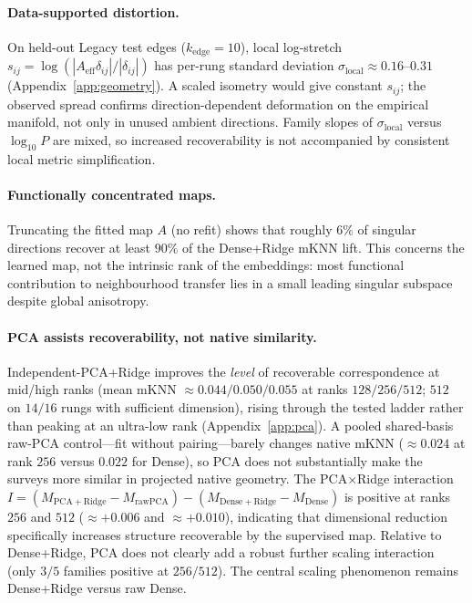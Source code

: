 \documentclass{article}
\begin{document}
\paragraph{Data-supported distortion.}
On held-out Legacy test edges (\(k_{\mathrm{edge}}{=}10\)), local log-stretch
\(s_{ij}=\log(|A_{\mathrm{eff}}\delta_{ij}|/|\delta_{ij}|)\)
has per-rung standard deviation \(\sigma_{\mathrm{local}}\approx0.16\)--\(0.31\) (Appendix~\ref{app:geometry}).
A scaled isometry would give constant \(s_{ij}\); the observed spread confirms direction-dependent deformation on the empirical manifold, not only in unused ambient directions.
Family slopes of \(\sigma_{\mathrm{local}}\) versus \(\log_{10}P\) are mixed, so increased recoverability is not accompanied by consistent local metric simplification.

\paragraph{Functionally concentrated maps.}
Truncating the fitted map \(A\) (no refit) shows that roughly \(6\%\) of singular directions recover at least \(90\%\) of the Dense+Ridge mKNN lift.
This concerns the learned map, not the intrinsic rank of the embeddings: most functional contribution to neighbourhood transfer lies in a small leading singular subspace despite global anisotropy.

\paragraph{PCA assists recoverability, not native similarity.}
Independent-PCA+Ridge improves the \emph{level} of recoverable correspondence at mid/high ranks (mean mKNN \(\approx0.044/0.050/0.055\) at ranks \(128/256/512\); \(512\) on \(14/16\) rungs with sufficient dimension), rising through the tested ladder rather than peaking at an ultra-low rank (Appendix~\ref{app:pca}).
A pooled shared-basis raw-PCA control---fit without pairing---barely changes native mKNN (\(\approx0.024\) at rank \(256\) versus \(0.022\) for Dense), so PCA does not substantially make the surveys more similar in projected native geometry.
The PCA\(\times\)Ridge interaction
\(I=(M_{\mathrm{PCA+Ridge}}-M_{\mathrm{rawPCA}})-(M_{\mathrm{Dense+Ridge}}-M_{\mathrm{Dense}})\)
is positive at ranks \(256\) and \(512\) (\(\approx{+}0.006\) and \(\approx{+}0.010\)), indicating that dimensional reduction specifically increases structure recoverable by the supervised map.
Relative to Dense+Ridge, PCA does not clearly add a robust further scaling interaction (only \(3/5\) families positive at \(256/512\)).
The central scaling phenomenon remains Dense+Ridge versus raw Dense.
\end{document}
